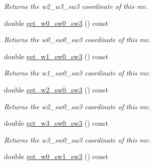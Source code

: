 \begin{DoxyCompactItemize}
\begin{DoxyCompactList}\small\item\em Returns the w2\-\_\-w3\-\_\-sw3 coordinate of this mv. \end{DoxyCompactList}\item 
\hypertarget{classe3ga_1_1mv_ac3f20f4c1775afff86ff87af0db259dc}{double \hyperlink{classe3ga_1_1mv_ac3f20f4c1775afff86ff87af0db259dc}{get\-\_\-w0\-\_\-sw0\-\_\-sw3} () const }\label{classe3ga_1_1mv_ac3f20f4c1775afff86ff87af0db259dc}

\begin{DoxyCompactList}\small\item\em Returns the w0\-\_\-sw0\-\_\-sw3 coordinate of this mv. \end{DoxyCompactList}\item 
\hypertarget{classe3ga_1_1mv_ac7a02d7ae576e0074d82d19b6ee856f5}{double \hyperlink{classe3ga_1_1mv_ac7a02d7ae576e0074d82d19b6ee856f5}{get\-\_\-w1\-\_\-sw0\-\_\-sw3} () const }\label{classe3ga_1_1mv_ac7a02d7ae576e0074d82d19b6ee856f5}

\begin{DoxyCompactList}\small\item\em Returns the w1\-\_\-sw0\-\_\-sw3 coordinate of this mv. \end{DoxyCompactList}\item 
\hypertarget{classe3ga_1_1mv_a0bbd5de2bf56d73d6628ce7ba42194de}{double \hyperlink{classe3ga_1_1mv_a0bbd5de2bf56d73d6628ce7ba42194de}{get\-\_\-w2\-\_\-sw0\-\_\-sw3} () const }\label{classe3ga_1_1mv_a0bbd5de2bf56d73d6628ce7ba42194de}

\begin{DoxyCompactList}\small\item\em Returns the w2\-\_\-sw0\-\_\-sw3 coordinate of this mv. \end{DoxyCompactList}\item 
\hypertarget{classe3ga_1_1mv_a7d3bbf00aaa5345c6bd27fd989bfec03}{double \hyperlink{classe3ga_1_1mv_a7d3bbf00aaa5345c6bd27fd989bfec03}{get\-\_\-w3\-\_\-sw0\-\_\-sw3} () const }\label{classe3ga_1_1mv_a7d3bbf00aaa5345c6bd27fd989bfec03}

\begin{DoxyCompactList}\small\item\em Returns the w3\-\_\-sw0\-\_\-sw3 coordinate of this mv. \end{DoxyCompactList}\item 
\hypertarget{classe3ga_1_1mv_ab13d3718a6174440e23fe4f126acdca9}{double \hyperlink{classe3ga_1_1mv_ab13d3718a6174440e23fe4f126acdca9}{get\-\_\-w0\-\_\-sw1\-\_\-sw3} () const }\label{classe3ga_1_1mv_ab13d3718a6174440e23fe4f126acdca9}


\end{DoxyCompactItemize}

